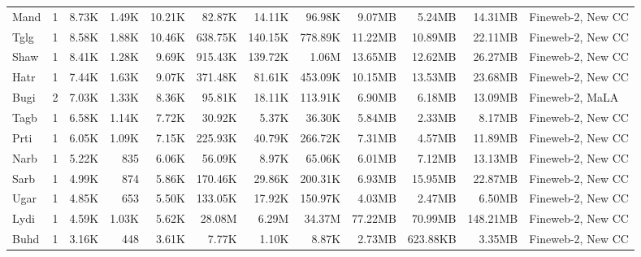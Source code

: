 \begin{table*}[!htp]
{\begin{tabular}{l|c|rrr|rrr|rrr|l}
Mand                    & 1                        & 8.73K    & 1.49K    & 10.21K  & 82.87K  & 14.11K  & 96.98K  & 9.07MB   & 5.24MB   & 14.31MB  & Fineweb-2, New CC              \\
Tglg                    & 1                        & 8.58K    & 1.88K    & 10.46K  & 638.75K & 140.15K & 778.89K & 11.22MB  & 10.89MB  & 22.11MB  & Fineweb-2, New CC              \\
Shaw                    & 1                        & 8.41K    & 1.28K    & 9.69K   & 915.43K & 139.72K & 1.06M   & 13.65MB  & 12.62MB  & 26.27MB  & Fineweb-2, New CC              \\
Hatr                    & 1                        & 7.44K    & 1.63K    & 9.07K   & 371.48K & 81.61K  & 453.09K & 10.15MB  & 13.53MB  & 23.68MB  & Fineweb-2, New CC              \\
Bugi                    & 2                        & 7.03K    & 1.33K    & 8.36K   & 95.81K  & 18.11K  & 113.91K & 6.90MB   & 6.18MB   & 13.09MB  & Fineweb-2, MaLA                \\
Tagb                    & 1                        & 6.58K    & 1.14K    & 7.72K   & 30.92K  & 5.37K   & 36.30K  & 5.84MB   & 2.33MB   & 8.17MB   & Fineweb-2, New CC              \\
Prti                    & 1                        & 6.05K    & 1.09K    & 7.15K   & 225.93K & 40.79K  & 266.72K & 7.31MB   & 4.57MB   & 11.89MB  & Fineweb-2, New CC              \\
Narb                    & 1                        & 5.22K    & 835      & 6.06K   & 56.09K  & 8.97K   & 65.06K  & 6.01MB   & 7.12MB   & 13.13MB  & Fineweb-2, New CC              \\
Sarb                    & 1                        & 4.99K    & 874      & 5.86K   & 170.46K & 29.86K  & 200.31K & 6.93MB   & 15.95MB  & 22.87MB  & Fineweb-2, New CC              \\
Ugar                    & 1                        & 4.85K    & 653      & 5.50K   & 133.05K & 17.92K  & 150.97K & 4.03MB   & 2.47MB   & 6.50MB   & Fineweb-2, New CC              \\
Lydi                    & 1                        & 4.59K    & 1.03K    & 5.62K   & 28.08M  & 6.29M   & 34.37M  & 77.22MB  & 70.99MB  & 148.21MB & Fineweb-2, New CC              \\
Buhd                    & 1                        & 3.16K    & 448      & 3.61K   & 7.77K   & 1.10K   & 8.87K   & 2.73MB   & 623.88KB & 3.35MB   & Fineweb-2, New CC              \\

\end{tabular}}
\end{table*}
